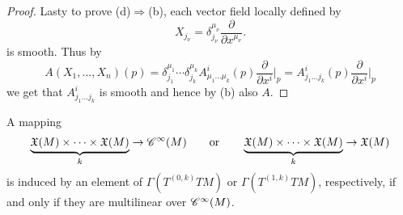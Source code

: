 \begin{appendix}
\begin{proof}
Lasty to prove (d)$\Rightarrow$(b), each vector field locally defined by 
\begin{equation*}
X_{j_\nu} = \delta^{\mu_\nu}_{j_\nu} \frac{\partial}{\partial x^{\mu_\nu}}.
\end{equation*}
\noindent is smooth. Thus by
\begin{equation*}
A(X_1,\dots,X_n)(p) = \delta^{\mu_1}_{j_1} \cdots \delta^{\mu_k}_{j_k} A^i_{\mu_1 \dots \mu_k}(p)\frac{\partial}{\partial x^i}\bigg\vert_p = A^i_{j_1\dots j_k}(p)\frac{\partial}{\partial x^i}\bigg\vert_p
\end{equation*}
\noindent we get that $A^i_{j_1 \dots j_k}$ is smooth and hence by (b) also $A$.
\end{proof}

\begin{theorem}
A mapping
\begin{equation*}
\underbrace{\mathfrak{X}(M) \times \dots \times \mathfrak{X}(M)}_{k} \to \mathscr{C}^\infty(M) \qquad \text{or} \qquad \underbrace{\mathfrak{X}(M) \times \dots \times \mathfrak{X}(M)}_{k} \to \mathfrak{X}(M)
\end{equation*}
\noindent is induced by an element of $\Gamma(T^{(0,k)}TM)$ or $\Gamma(T^{(1,k)}TM)$, respectively, if and only if they are multilinear over $\mathscr{C}^\infty(M)$.
\label{thm:tensor_char}
\end{theorem}


\end{appendix}
